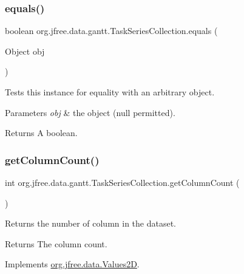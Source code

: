 \subsubsection{\texorpdfstring{equals()}{equals()}}
{\footnotesize\ttfamily boolean org.\+jfree.\+data.\+gantt.\+Task\+Series\+Collection.\+equals (\begin{DoxyParamCaption}\item[{Object}]{obj }\end{DoxyParamCaption})}

Tests this instance for equality with an arbitrary object.


\begin{DoxyParams}{Parameters}
{\em obj} & the object ({\ttfamily null} permitted).\\
\hline
\end{DoxyParams}
\begin{DoxyReturn}{Returns}
A boolean. 
\end{DoxyReturn}
\mbox{\label{classorg_1_1jfree_1_1data_1_1gantt_1_1_task_series_collection_a3435a5d25be65ed939629418205b0022}} 
\subsubsection{\texorpdfstring{get\+Column\+Count()}{getColumnCount()}}
{\footnotesize\ttfamily int org.\+jfree.\+data.\+gantt.\+Task\+Series\+Collection.\+get\+Column\+Count (\begin{DoxyParamCaption}{ }\end{DoxyParamCaption})}

Returns the number of column in the dataset.

\begin{DoxyReturn}{Returns}
The column count. 
\end{DoxyReturn}


Implements \mbox{\hyperlink{interfaceorg_1_1jfree_1_1data_1_1_values2_d_a212e32802dc2f32e0fb641740137c685}{org.\+jfree.\+data.\+Values2D}}.

\mbox{\label{classorg_1_1jfree_1_1data_1_1gantt_1_1_task_series_collection_a3d161e58090dcf60534fd670a387f429}} 
